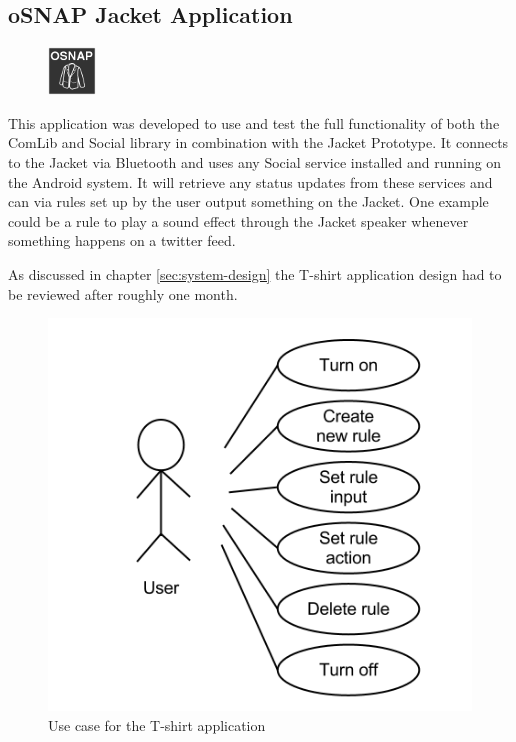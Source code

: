\subsection{oSNAP Jacket Application} \label{section:app-jacket}
\begin{figure}
	\centering \includegraphics[scale=1]{img/app-jacket}
\end{figure}
This application was developed to use and test the full functionality of both the ComLib and Social library in combination with the
Jacket Prototype. It connects to the Jacket via Bluetooth and uses any Social service installed and running on the
Android system. It will retrieve any status updates from these services and can via rules set up by the user output something
on the Jacket. One example could be a rule to play a sound effect through the Jacket speaker whenever something happens
on a twitter feed.

As discussed in chapter \ref{sec:system-design} the T-shirt application design had to be reviewed after roughly one month.

\begin{figure}[H]
	\centering \includegraphics[scale=0.35]{img/design-tshirtappusecase2}
	\caption{Use case for the T-shirt application}
	\label{fig:design-tshirtappusecase2}
\end{figure}

